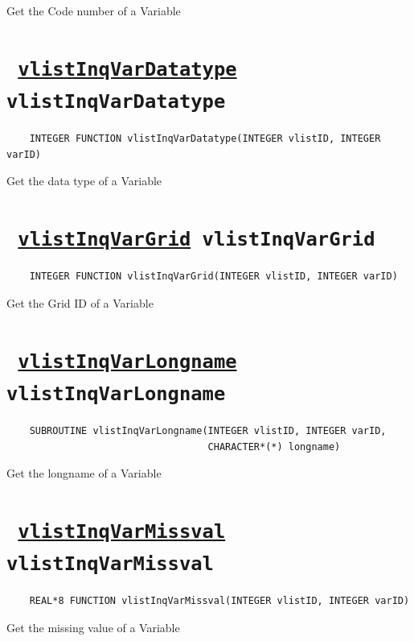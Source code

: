 Get the Code number of a Variable
\ifpdfoutput{}{(\ref{vlistInqVarCode})}


\section*{\texttt{ 
\ifpdf
\hyperref[vlistInqVarDatatype]{vlistInqVarDatatype}
\else
vlistInqVarDatatype
\fi
}}
\begin{verbatim}
    INTEGER FUNCTION vlistInqVarDatatype(INTEGER vlistID, INTEGER varID)
\end{verbatim}

Get the data type of a Variable
\ifpdfoutput{}{(\ref{vlistInqVarDatatype})}


\section*{\texttt{ 
\ifpdf
\hyperref[vlistInqVarGrid]{vlistInqVarGrid}
\else
vlistInqVarGrid
\fi
}}
\begin{verbatim}
    INTEGER FUNCTION vlistInqVarGrid(INTEGER vlistID, INTEGER varID)
\end{verbatim}

Get the Grid ID of a Variable
\ifpdfoutput{}{(\ref{vlistInqVarGrid})}


\section*{\texttt{ 
\ifpdf
\hyperref[vlistInqVarLongname]{vlistInqVarLongname}
\else
vlistInqVarLongname
\fi
}}
\begin{verbatim}
    SUBROUTINE vlistInqVarLongname(INTEGER vlistID, INTEGER varID, 
                                   CHARACTER*(*) longname)
\end{verbatim}

Get the longname of a Variable
\ifpdfoutput{}{(\ref{vlistInqVarLongname})}


\section*{\texttt{ 
\ifpdf
\hyperref[vlistInqVarMissval]{vlistInqVarMissval}
\else
vlistInqVarMissval
\fi
}}
\begin{verbatim}
    REAL*8 FUNCTION vlistInqVarMissval(INTEGER vlistID, INTEGER varID)
\end{verbatim}

Get the missing value of a Variable
\ifpdfoutput{}{(\ref{vlistInqVarMissval})}


